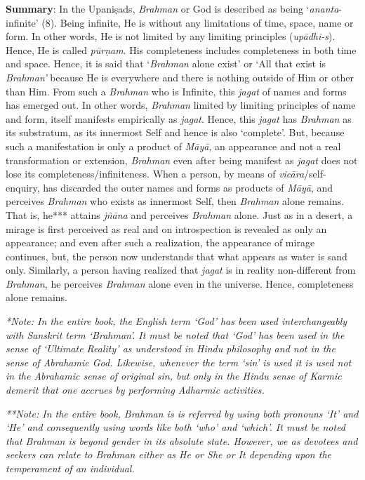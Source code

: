 \textbf{Summary}: In the Upaniṣads, \emph{Brahman} or God is described as being `\emph{ananta}-infinite' (8). Being infinite, He is without any limitations of time, space, name or form. In other words, He is not limited by any limiting principles (\emph{upādhi-s}). Hence, He is called \emph{pūrṇam}. His completeness includes completeness in both time and space. Hence, it is said that `\emph{Brahman} alone exist' or `All that exist is \emph{Brahman'} because He is everywhere and there is nothing outside of Him or other than Him. From such a \emph{Brahman} who is Infinite, this \emph{jagat} of names and forms has emerged out. In other words, \emph{Brahman} limited by limiting principles of name and form, itself manifests empirically as \emph{jagat}. Hence, this \emph{jagat} has \emph{Brahman} as its substratum, as its innermost Self and hence is also `complete'. But, because such a manifestation is only a product of \emph{Māyā}, an appearance and not a real transformation or extension, \emph{Brahman} even after being manifest as \emph{jagat} does not lose its completeness/infiniteness. When a person, by means of \emph{vicāra}/self-enquiry, has discarded the outer names and forms as products of \emph{Māyā}, and perceives \emph{Brahman} who exists as innermost Self, then \emph{Brahman} alone remains. That is, he*** attains \emph{jñāna} and perceives \emph{Brahman} alone. Just as in a desert, a mirage is first perceived as real and on introspection is revealed as only an appearance; and even after such a realization, the appearance of mirage continues, but, the person now understands that what appears as water is sand only. Similarly, a person having realized that \emph{jagat} is in reality non-different from \emph{Brahman}, he perceives \emph{Brahman} alone even in the universe. Hence, completeness alone remains.

\emph{*Note: In the entire book, the English term `God' has been used interchangeably with Sanskrit term `Brahman'. It must be noted that `God' has been used in the sense of `Ultimate Reality' as understood in Hindu philosophy and not in the sense of Abrahamic God. Likewise, whenever the term `sin' is used it is used not in the Abrahamic sense of original sin, but only in the Hindu sense of Karmic demerit that one accrues by performing Adharmic activities.}

\emph{**Note: In the entire book, Brahman is is referred by using both pronouns `It' and `He' and consequently using words like both `who' and `which'. It must be noted that Brahman is beyond gender in its absolute state. However, we as devotees and seekers can relate to Brahman either as He or She or It depending upon the temperament of an individual.}
\newpage

